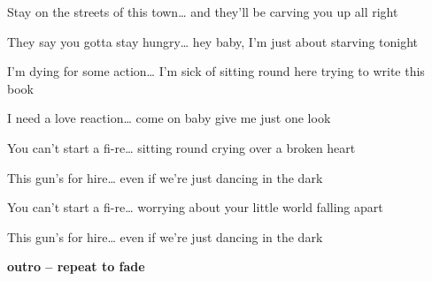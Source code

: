  Stay on the streets of this town…  and they'll be carving you
up all right

They say you gotta stay hungry…  hey baby, I'm just about
starving tonight

I'm dying for some action…  I'm sick of sitting round here trying
to write this book

I need a love reaction…  come on baby give me just one look

You can't start a fi-re… sitting round crying over a broken heart

This gun's for hire…  even if we're just dancing in the dark

You can't start a fi-re… worrying about your little world falling apart

This gun's for hire…  even if we're just dancing in the  dark

\textbf{outro – repeat to fade}    
